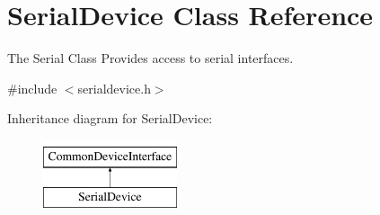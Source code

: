 \hypertarget{class_serial_device}{}\section{Serial\+Device Class Reference}
\label{class_serial_device}


The Serial Class Provides access to serial interfaces.  




{\ttfamily \#include $<$serialdevice.\+h$>$}

Inheritance diagram for Serial\+Device\+:\begin{figure}[H]
\begin{center}
\leavevmode
\includegraphics[height=2.000000cm]{class_serial_device}
\end{center}
\end{figure}
